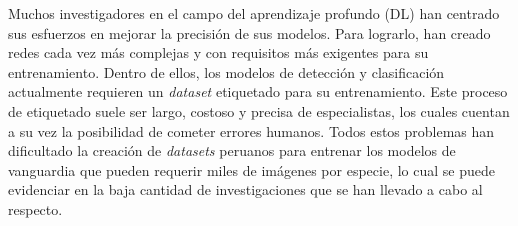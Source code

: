 Muchos investigadores en el campo del aprendizaje profundo (DL) 
han centrado sus esfuerzos en mejorar la precisión de sus modelos. Para 
lograrlo, han creado redes cada vez más complejas y con requisitos más 
exigentes para su entrenamiento. Dentro de ellos, los modelos de detección 
y clasificación actualmente requieren un \textit{dataset} etiquetado para su 
entrenamiento. Este proceso de etiquetado suele ser largo, costoso y precisa de  
especialistas, los cuales cuentan a su vez la posibilidad de cometer 
errores humanos. Todos estos problemas han dificultado la creación de 
\textit{datasets} peruanos para entrenar los modelos de vanguardia que pueden 
requerir miles de imágenes por especie, lo cual se puede evidenciar en la 
baja cantidad de investigaciones que se han llevado a cabo al respecto. 